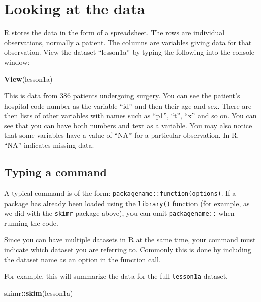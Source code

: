 \documentclass[]{book}
\newenvironment{Shaded}{\begin{snugshade}}{\end{snugshade}}
\newcommand{\KeywordTok}[1]{\textcolor[rgb]{0.13,0.29,0.53}{\textbf{#1}}}
\newcommand{\NormalTok}[1]{#1}
\newcommand{\OperatorTok}[1]{\textcolor[rgb]{0.81,0.36,0.00}{\textbf{#1}}}
\begin{document}
\hypertarget{looking-at-the-data}{%
\section{Looking at the data}\label{looking-at-the-data}}

R stores the data in the form of a spreadsheet. The rows are individual
observations, normally a patient. The columns are variables giving data
for that observation. View the dataset ``lesson1a'' by typing the
following into the console window:

\begin{Shaded}
\begin{Highlighting}[]
\KeywordTok{View}\NormalTok{(lesson1a)}
\end{Highlighting}
\end{Shaded}

This is data from 386 patients undergoing surgery. You can see the
patient's hospital code number as the variable ``id'' and then their age
and sex. There are then lists of other variables with names such as
``p1'', ``t'', ``x'' and so on. You can see that you can have both
numbers and text as a variable. You may also notice that some variables
have a value of ``NA'' for a particular observation. In R, ``NA''
indicates missing data.

\hypertarget{typing-a-command}{%
\subsection{Typing a command}\label{typing-a-command}}

A typical command is of the form:
\texttt{packagename::function(options)}. If a package has already been
loaded using the \texttt{library()} function (for example, as we did
with the \texttt{skimr} package above), you can omit
\texttt{packagename::} when running the code.

Since you can have multiple datasets in R at the same time, your command
must indicate which dataset you are referring to. Commonly this is done
by including the dataset name as an option in the function call.

For example, this will summarize the data for the full \texttt{lesson1a}
dataset.

\begin{Shaded}
\begin{Highlighting}[]
\NormalTok{skimr}\OperatorTok{::}\KeywordTok{skim}\NormalTok{(lesson1a)}
\end{Highlighting}
\end{Shaded}
\end{document}
